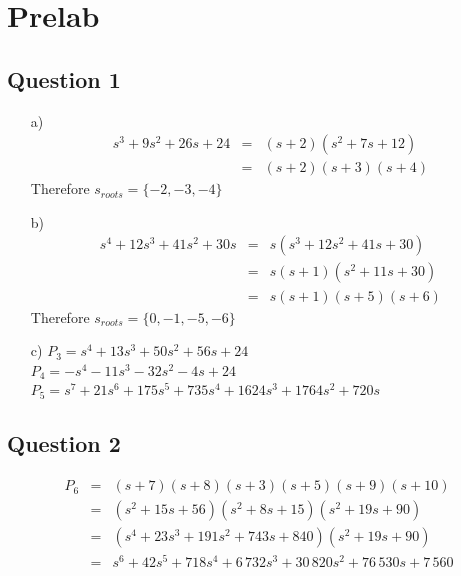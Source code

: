 \documentclass[12pt, a4paper]{article}
\begin{document}
	\section{Prelab} %
	\label{sec:prelab}
		\subsection*{Question 1} %
		\label{sub:question_1}
			\begin{itemize}
				\item[a)]
					\[
						\begin{array}{rcl}
							s^3 + 9s^2 + 26s + 24 & = & (s+2)(s^2 + 7s + 12) \\
							& = & (s+2)(s+3)(s+4)
						\end{array}
					\]
					Therefore $s_{roots} = \{-2,-3,-4\}$
				\item[b)]
					\[
						\begin{array}{rcl}
							s^4 + 12s^3 + 41s^2 + 30s & = & s(s^3 + 12s^2 + 41s +30) \\
							& = & s(s+1)(s^2 + 11s + 30) \\
							& = & s(s+1)(s+5)(s+6)
						\end{array}
					\]
					Therefore $s_{roots} = \{0,-1,-5,-6\}$
				\item[c)] $P_3 = s^4 + 13s^3 + 50s^2 + 56s + 24$\\
						  $P_4 = -s^4 -11s^3 -32s^2 -4s + 24$ \\
						  $P_5 = s^7 + 21s^6 + 175s^5 +735s^4 + 1624s^3 + 1764s^2 + 720s$
			\end{itemize}

		\subsection*{Question 2} %
		\label{sub:question_2}
			\begin{equation*}
				\begin{array}{rcl}
					P_6 & = & (s+7)(s+8)(s+3)(s+5)(s+9)(s+10) \\
					& = & (s^2+15s+56)(s^2+8s+15)(s^2+19s+90) \\
					& = & (s^4 + 23s^3 +191s^2+743s+840)(s^2+19s+90) \\
					& = & s^6 + 42s^5 +718s^4 + 6\,732s^3 + 30\,820s^2 + 76\,530s + 7\,560
				\end{array}
			\end{equation*}
\end{document}

